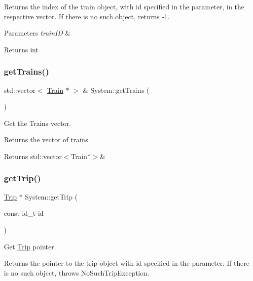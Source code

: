 Returns the index of the train object, with id specified in the parameter, in the respective vector. If there is no such object, returns -\/1.


\begin{DoxyParams}{Parameters}
{\em train\+ID} & \\
\hline
\end{DoxyParams}
\begin{DoxyReturn}{Returns}
int 
\end{DoxyReturn}
\mbox{\label{classSystem_a44ee205bcb6c27bb1a7bc7fb545aef44}} 
\subsubsection{\texorpdfstring{get\+Trains()}{getTrains()}}
{\footnotesize\ttfamily std\+::vector$<$ \mbox{\hyperlink{classTrain}{Train}} $\ast$ $>$ \& System\+::get\+Trains (\begin{DoxyParamCaption}{ }\end{DoxyParamCaption})}



Get the Trains vector. 

Returns the vector of trains.

\begin{DoxyReturn}{Returns}
std\+::vector$<$\+Train$\ast$$>$\& 
\end{DoxyReturn}
\mbox{\label{classSystem_a518ff04299c8b37d3cbec814ac0b7ec6}} 
\subsubsection{\texorpdfstring{get\+Trip()}{getTrip()}}
{\footnotesize\ttfamily \mbox{\hyperlink{classTrip}{Trip}} $\ast$ System\+::get\+Trip (\begin{DoxyParamCaption}\item[{const id\+\_\+t}]{id }\end{DoxyParamCaption})}



Get \mbox{\hyperlink{classTrip}{Trip}} pointer. 

Returns the pointer to the trip object with id specified in the parameter. If there is no such object, throws No\+Such\+Trip\+Exception.



